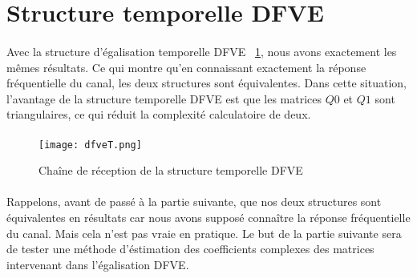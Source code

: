 \section{Structure temporelle DFVE}
\paragraph{}
Avec la structure d'égalisation temporelle DFVE ~\ref{dfveT}, nous avons exactement les mêmes résultats. Ce qui montre qu'en connaissant exactement la réponse fréquentielle du canal, les deux structures sont équivalentes. Dans cette situation, l'avantage de la structure temporelle DFVE est que les matrices $Q0$ et $Q1$ sont triangulaires, ce qui réduit la complexité calculatoire de deux.
\paragraph{}
\vspace{1\baselineskip}
\begin{figure}[!h]
  \centering
  \texttt{[image: dfveT.png]}
  \caption{Chaîne de réception de la structure temporelle DFVE}
	\label{dfveT} 
\end{figure}
\vspace{2\baselineskip}

\paragraph{}
Rappelons, avant de passé à la partie suivante, que nos deux structures sont équivalentes en résultats car nous avons supposé connaître la réponse fréquentielle du canal. Mais cela n'est pas vraie en pratique. Le but de la partie suivante sera de tester une méthode d'éstimation des coefficients complexes des matrices intervenant dans l'égalisation DFVE.

